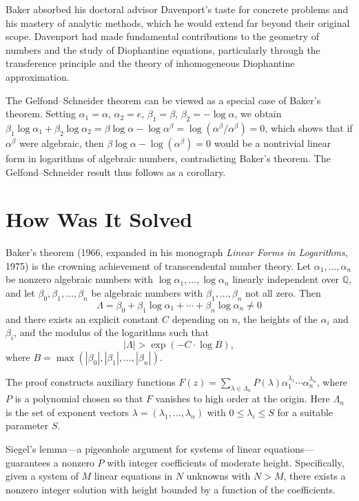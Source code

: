 Baker absorbed his doctoral advisor Davenport's taste for concrete problems and his mastery of analytic methods, which he would extend far beyond their original scope. Davenport had made fundamental contributions to the geometry of numbers and the study of Diophantine equations, particularly through the transference principle and the theory of inhomogeneous Diophantine approximation.

The Gelfond--Schneider theorem can be viewed as a special case of Baker's theorem. Setting $\alpha_1 = \alpha$, $\alpha_2 = e$, $\beta_1 = \beta$, $\beta_2 = -\log \alpha$, we obtain $\beta_1 \log \alpha_1 + \beta_2 \log \alpha_2 = \beta \log \alpha - \log \alpha^\beta = \log(\alpha^\beta / \alpha^\beta) = 0$, which shows that if $\alpha^\beta$ were algebraic, then $\beta \log \alpha - \log(\alpha^\beta) = 0$ would be a nontrivial linear form in logarithms of algebraic numbers, contradicting Baker's theorem. The Gelfond--Schneider result thus follows as a corollary.

\section{How Was It Solved}

Baker's theorem (1966, expanded in his monograph \emph{Linear Forms in Logarithms}, 1975) is the crowning achievement of transcendental number theory. Let $\alpha_1, \ldots, \alpha_n$ be nonzero algebraic numbers with $\log \alpha_1, \ldots, \log \alpha_n$ linearly independent over $\mathbb{Q}$, and let $\beta_0, \beta_1, \ldots, \beta_n$ be algebraic numbers with $\beta_1, \ldots, \beta_n$ not all zero. Then
\[
\Lambda = \beta_0 + \beta_1 \log \alpha_1 + \cdots + \beta_n \log \alpha_n \neq 0
\]
and there exists an explicit constant $C$ depending on $n$, the heights of the $\alpha_i$ and $\beta_i$, and the modulus of the logarithms such that
\[
|\Lambda| > \exp(-C \cdot \log B),
\]
where $B = \max(|\beta_0|, |\beta_1|, \ldots, |\beta_n|)$.

The proof constructs auxiliary functions $F(z) = \sum_{\lambda \in \Lambda_n} P(\lambda) \alpha_1^{\lambda_1} \cdots \alpha_n^{\lambda_n}$, where $P$ is a polynomial chosen so that $F$ vanishes to high order at the origin. Here $\Lambda_n$ is the set of exponent vectors $\lambda = (\lambda_1, \ldots, \lambda_n)$ with $0 \leq \lambda_i \leq S$ for a suitable parameter $S$.

Siegel's lemma---a pigeonhole argument for systems of linear equations---guarantees a nonzero $P$ with integer coefficients of moderate height. Specifically, given a system of $M$ linear equations in $N$ unknowns with $N > M$, there exists a nonzero integer solution with height bounded by a function of the coefficients.

